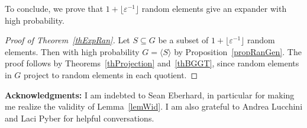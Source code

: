 \documentclass[11pt,reqno]{amsart}
\numberwithin{equation}{section}
\theoremstyle{definition}
\theoremstyle{remark}
\newtheorem{remark}[theorem]{Remark}
\begin{document}
To conclude, we prove that
$1 + \lfloor \varepsilon^{-1} \rfloor$ random elements give an expander with high probability.

\begin{proof}[Proof of Theorem~\ref{thExpRan}]
Let $S \subseteq G$ be a subset of $1 + \lfloor \varepsilon^{-1} \rfloor$ random elements.
Then with high probability $G=\langle S \rangle$ by Proposition~\ref{propRanGen}.
The proof follows by Theorems~\ref{thProjection} and~\ref{thBGGT},
since random elements in $G$ project to random elements in each quotient.
\end{proof}









\vspace{0.1cm} \noindent
{\bfseries Acknowledgments:}
I am indebted to Sean Eberhard,
in particular for making me realize the validity of Lemma~\ref{lemWid}.
I am also grateful to Andrea Lucchini and Laci Pyber for helpful conversations.
\end{document}
